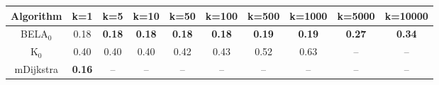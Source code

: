 \begin{tabular}{c|ccccccccc}\toprule
Algorithm & k=1 & k=5 & k=10 & k=50 & k=100 & k=500 & k=1000 & k=5000 & k=10000 \\ \midrule
BELA$_0$ & 0.18 & \textbf{0.18} & \textbf{0.18} & \textbf{0.18} & \textbf{0.18} & \textbf{0.19} & \textbf{0.19} & \textbf{0.27} & \textbf{0.34} \\
K$_0$ & 0.40 & 0.40 & 0.40 & 0.42 & 0.43 & 0.52 & 0.63 & -- & -- \\
mDijkstra & \textbf{0.16} & -- & -- & -- & -- & -- & -- & -- & -- \\ \bottomrule 
\end{tabular}
